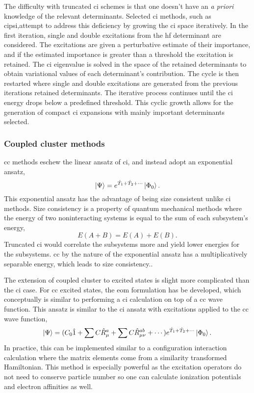 The difficulty with truncated \gls{ci} schemes is that one doesn't have an \textit{a priori} knowledge of the relevant determinants.
Selected \gls{ci} methods, such as \gls{cipsi},\citehere attempt to address this deficiency by growing the \gls{ci} space iteratively.
In the first iteration, single and double excitations from the \gls{hf} determinant are considered.
The excitations are given a perturbative estimate of their importance, and if the estimated importance is greater than a threshold the excitation is retained.
The \gls{ci} eigenvalue is solved in the space of the retained determinants to obtain variational values of each determinant's contribution.
The cycle is then restarted where single and double excitations are generated from the previous iterations retained determinants.
The iterative process continues until the \gls{ci} energy drops below a predefined threshold.
This cyclic growth allows for the generation of compact \gls{ci} expansions with mainly important determinants selected.

\subsubsection{Coupled cluster methods}
\Gls{cc} methods eschew the linear ansatz of \gls{ci}, and instead adopt an exponential ansatz,
\begin{equation}
    \ket{\Psi} = e^{\hat{T}_1 + \hat{T}_2 + \cdots}\ket{\Phi_0}.
    \label{eq:cc_ansatz}
\end{equation}
This exponential ansatz has the advantage of being size consistent unlike \gls{ci} methods.
Size consistency is a property of quantum mechanical methods where the energy of two noninteracting systems  is equal to the sum of each subsystem's energy,
\begin{equation}
    E(A+B) = E(A) + E(B).
\end{equation}
Truncated \gls{ci} would correlate the subsystems more and yield lower energies for the subsystems.
\gls{cc} by the nature of the exponential ansatz has a multiplicatively separable energy, which leads to size consistency..

The extension of coupled cluster to excited states is slight more complicated than the \gls{ci} case. 
For \gls{cc} excited states, the \gls{eom} formulation has be developed, which conceptually is similar to performing a \gls{ci} calculation on top of a \gls{cc} wave function.
This ansatz is similar to the \gls{ci} ansatz with excitations applied to the \gls{cc} wave function,
\begin{equation}
    \ket{\Psi} = (C_0 \hat{1} + \sum C \hat{R}_{\mu}^{a} + \sum C \hat{R}_{\mu\nu}^{ab} + \cdots ) e^{\hat{T}_1 + \hat{T}_2 + \cdots}\ket{\Phi_0}.
\end{equation}
In practice, this can be implemented similar to a configuration interaction calculation where the matrix elements come from a similarity transformed Hamiltonian.
This method is especially powerful as the excitation operators do not need to conserve particle number so one can calculate ionization potentials and electron affinities as well.
